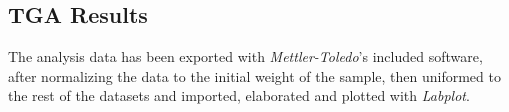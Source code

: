 \documentclass[a4paper]{article}
\begin{document}
                \begin{table}[ht]
                    \centering 
                    \caption{Results of the DSC analysis showcasing phase transition points, enthalpies and crystallinity of the material}
                    \label{tab:DSC_Results}
                \end{table}

        \clearpage

        \subsection{TGA Results\label{TGA_Results}}
        The analysis data has been exported with \textit{Mettler-Toledo}'s included software, after normalizing the data to the initial weight of the sample,
        then uniformed to the rest of the datasets and imported, elaborated and plotted with \textit{Labplot}. \\
\end{document}
